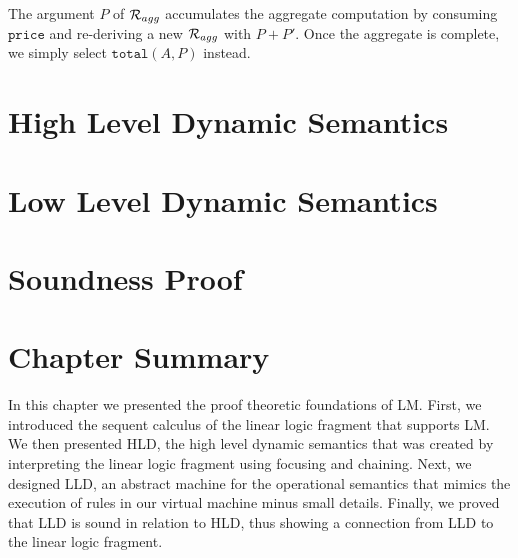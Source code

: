 The argument $P$ of $\mathcal{R}_{agg}$ accumulates the aggregate computation by
consuming $\mathtt{price}$ and re-deriving a new $\mathcal{R}_{agg}$ with $P +
P'$. Once the aggregate is complete, we simply select $\mathtt{total}(A, P)$
instead.

\section{High Level Dynamic Semantics}



\section{Low Level Dynamic Semantics}

\section{Soundness Proof}

\section{Chapter Summary}

In this chapter we presented the proof theoretic foundations of LM.  First, we
introduced the sequent calculus of the linear logic fragment that supports LM. We then
presented HLD, the high level dynamic semantics that was created by interpreting
the linear logic fragment using focusing and chaining. Next, we designed LLD,
an abstract machine for the operational semantics that mimics the execution of
rules in our virtual machine minus small details.  Finally, we proved that LLD is sound
in relation to HLD, thus showing a connection from LLD to the linear logic
fragment.

